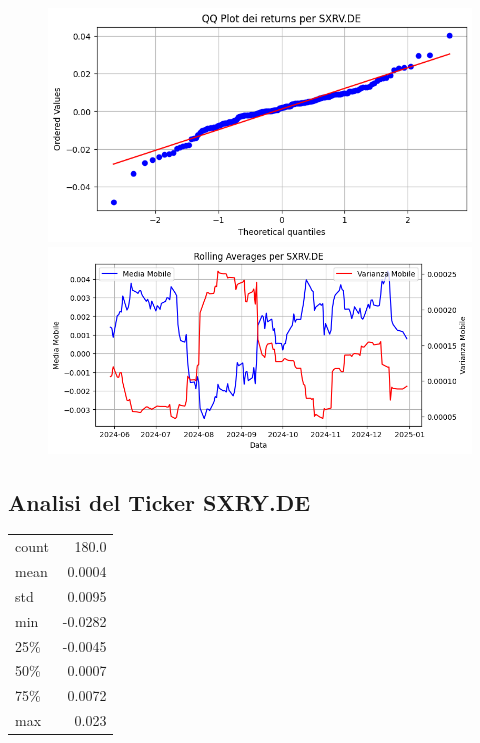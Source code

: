 \documentclass{article}%
\begin{document}
%


\begin{figure}[htbp]%
\begin{minipage}{0.48\textwidth}%
\includegraphics[width=\linewidth]{immagini_tickers/SXRV.DE_qq_plot.png}%
\end{minipage}%
\begin{minipage}{0.48\textwidth}%
\includegraphics[width=\linewidth]{immagini_tickers/SXRV.DE_rolling_averages.png}%
\end{minipage}%
\end{figure}

%
\subsection*{Analisi del Ticker SXRY.DE}%
\label{subsec:AnalisidelTickerSXRY.DE}%
\begin{tabular}{lr}%
count&180.0\\%
mean&0.0004\\%
std&0.0095\\%
min&{-}0.0282\\%
25\%&{-}0.0045\\%
50\%&0.0007\\%
75\%&0.0072\\%
max&0.023\\%
\end{tabular}%
\end{document}
